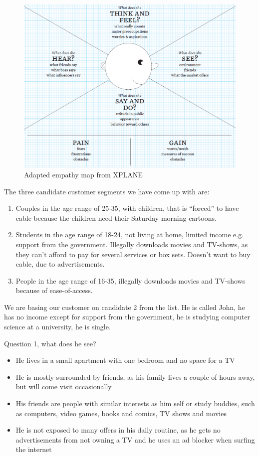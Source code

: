 \begin{figure}[h]
    \begin{center}
        \includegraphics[scale=0.52]{./pics/empathy_map}
        \caption{Adapted empathy map from XPLANE\cite[p. 130]{canvas}}
        \label{fig:empathy_map}
    \end{center}
\end{figure}

The three candidate customer segments we have come up with are:
\begin{enumerate}
\item Couples in the age range of 25-35, with children, that is ``forced'' to have cable because the children need their Saturday morning cartoons.
\item Students in the age range of 18-24, not living at home, limited income e.g. support from the government. Illegally downloads movies and TV-shows, as they can't afford to pay for several services or box sets. Doesn't want to buy cable, due to advertisements.
\item People in the age range of 16-35, illegally downloads movies and TV-shows because of ease-of-access.
\end{enumerate}

We are basing our customer on candidate 2 from the list. He is called John, he has no income except for support from the government, he is studying computer science at a university, he is single.

Question 1, what does he see?
\begin{itemize}
\item He lives in a small apartment with one bedroom and no space for a TV
\item He is mostly surrounded by friends, as his family lives a couple of hours away, but will come visit occasionally 
\item His friends are people with similar interests as him self or study buddies, such as computers, video games, books and comics, TV shows and movies
\item He is not exposed to many offers in his daily routine, as he gets no advertisements from not owning a TV and he uses an ad blocker when surfing the internet
\end{itemize}

